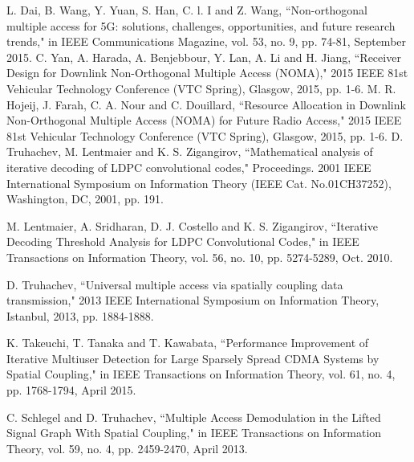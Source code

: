 \documentclass[conference]{IEEEtran}
\begin{document}
%
%
%
\begin{thebibliography}{100}

L. Dai, B. Wang, Y. Yuan, S. Han, C. l. I and Z. Wang, ``Non-orthogonal multiple access for 5G: solutions, challenges, opportunities, and future research trends," in IEEE Communications Magazine, vol. 53, no. 9, pp. 74-81, September 2015.
C. Yan, A. Harada, A. Benjebbour, Y. Lan, A. Li and H. Jiang, ``Receiver Design for Downlink Non-Orthogonal Multiple Access (NOMA)," 2015 IEEE 81st Vehicular Technology Conference (VTC Spring), Glasgow, 2015, pp. 1-6.
M. R. Hojeij, J. Farah, C. A. Nour and C. Douillard, ``Resource Allocation in Downlink Non-Orthogonal Multiple Access (NOMA) for Future Radio Access," 2015 IEEE 81st Vehicular Technology Conference (VTC Spring), Glasgow, 2015, pp. 1-6.
D. Truhachev, M. Lentmaier and K. S. Zigangirov, ``Mathematical analysis of iterative decoding of LDPC convolutional codes," Proceedings. 2001 IEEE International Symposium on Information Theory (IEEE Cat. No.01CH37252), Washington, DC, 2001, pp. 191.

M. Lentmaier, A. Sridharan, D. J. Costello and K. S. Zigangirov, ``Iterative Decoding Threshold Analysis for LDPC Convolutional Codes," in IEEE Transactions on Information Theory, vol. 56, no. 10, pp. 5274-5289, Oct. 2010.

D. Truhachev, ``Universal multiple access via spatially coupling data transmission," 2013 IEEE International Symposium on Information Theory, Istanbul, 2013, pp. 1884-1888.

K. Takeuchi, T. Tanaka and T. Kawabata, ``Performance Improvement of Iterative Multiuser Detection for Large Sparsely Spread CDMA Systems by Spatial Coupling," in IEEE Transactions on Information Theory, vol. 61, no. 4, pp. 1768-1794, April 2015.

C. Schlegel and D. Truhachev, ``Multiple Access Demodulation in the Lifted Signal Graph With Spatial Coupling," in IEEE Transactions on Information Theory, vol. 59, no. 4, pp. 2459-2470, April 2013.


\end{thebibliography}
\end{document}
